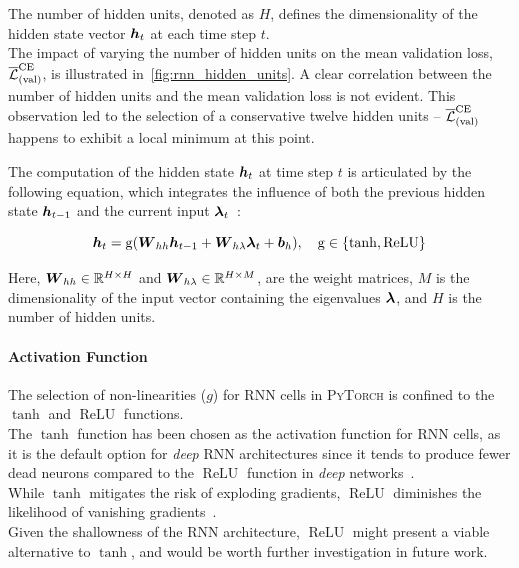 The number of hidden units, denoted as \(H\), defines the dimensionality of the hidden state vector \(\boldsymbol{h}_t\) at
each time step \(t\).\\
The impact of varying the number of hidden units on the mean validation loss, \(\overline{\mathcal{L}}_{(\text{val})}^{\text{CE}}\),
is illustrated in~\autoref{fig:rnn_hidden_units}.
A clear correlation between the number of hidden units and the mean validation loss is not evident. This observation led
to the selection of a conservative twelve hidden units -- \( \overline{\mathcal{L}}_{(\text{val})}^{\text{CE}} \) happens to exhibit a local minimum at this point.

The computation of the hidden state \(\boldsymbol{h}_t\) at time step \(t\) is articulated by the following equation, which
integrates the influence of both the previous hidden state \(\boldsymbol{h}_{t-1}\) and the current input \(\boldsymbol{\lambda}_t\)~\cite{dlcheatsheet}:

\begin{equation}
    \boldsymbol{h}_t = \operatorname{g}(\boldsymbol{W}_{hh} \boldsymbol{h}_{t-1} + \boldsymbol{W}_{h\lambda} \boldsymbol{\lambda}_t + \boldsymbol{b}_h), \quad \operatorname{g} \in \{\operatorname{tanh}, \operatorname{ReLU}\}
    \label{eq:rnn_hidden_state}
\end{equation}

Here, \(\boldsymbol{W}_{hh} \in \mathbb{R}^{H \times H}\) and \(\boldsymbol{W}_{h\lambda} \in \mathbb{R}^{H \times M}\),
are the weight matrices, \( M \) is the dimensionality of the input vector containing the eigenvalues \( \boldsymbol{\lambda} \), and
\(H\) is the number of hidden units.

\paragraph{Activation Function} The selection of non-linearities (\( g \)) for RNN cells in \textsc{PyTorch} is confined to
the \(\operatorname{tanh}\) and \(\operatorname{ReLU}\) functions. \\
The \(\operatorname{tanh}\) function has been chosen as the activation function for RNN cells, as it is the default option
for \emph{deep} RNN architectures since it tends to produce fewer dead neurons compared to the \(\operatorname{ReLU}\) function in \emph{deep} networks~\cite{lecun1998}. \\
While \(\operatorname{tanh}\) mitigates the risk of exploding gradients, \(\operatorname{ReLU}\) diminishes the likelihood of
vanishing gradients~\cite{pascanu2013difficulty}.\\
Given the shallowness of the RNN architecture, \(\operatorname{ReLU}\) might present a viable alternative to \(\operatorname{tanh}\),
and would be worth further investigation in future work.

